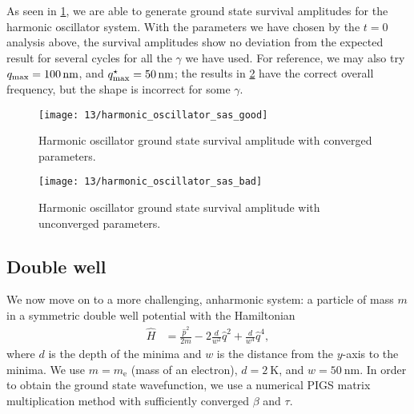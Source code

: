 As seen in \cref{fig:harmonic-oscillator-survival-good}, we are able to generate ground state survival amplitudes for the harmonic oscillator system.
With the parameters we have chosen by the $t = 0$ analysis above, the survival amplitudes show no deviation from the expected result for several cycles for all the $\gamma$ we have used.
For reference, we may also try $q_\mathrm{max} = \SI{100}{\nano\meter}$, and $q_\mathrm{max}^\star = \SI{50}{\nano\meter}$; the results in \cref{fig:harmonic-oscillator-survival-bad} have the correct overall frequency, but the shape is incorrect for some $\gamma$.

\begin{figure}
	\centering
	\texttt{[image: 13/harmonic\_oscillator\_sas\_good]}
	\caption[
		Harmonic oscillator survival amplitude with converged parameters
	]{
		Harmonic oscillator ground state survival amplitude with converged parameters.
		\explainplotsas{}
	}
	\label{fig:harmonic-oscillator-survival-good}
\end{figure}

\begin{figure}
	\centering
	\texttt{[image: 13/harmonic\_oscillator\_sas\_bad]}
	\caption[
		Harmonic oscillator survival amplitude with unconverged parameters
	]{
		Harmonic oscillator ground state survival amplitude with unconverged parameters.
		\explainplotsas{}
	}
	\label{fig:harmonic-oscillator-survival-bad}
\end{figure}


\subsection{Double well}

\label{sec:semiclassical-numerical-dw}

We now move on to a more challenging, anharmonic system: a particle of mass $m$ in a symmetric double well potential with the Hamiltonian
\begin{align}
	\hat{H}
	&= \frac{\hat{p}^2}{2 m} - 2 \frac{d}{w^2} \hat{q}^2 + \frac{d}{w^4} \hat{q}^4,
\end{align}
where $d$ is the depth of the minima and $w$ is the distance from the $y$-axis to the minima.
We use $m = m_\mathrm{e}$ (mass of an electron), $d = \SI{2}{\kelvin}$, and $w = \SI{50}{\nano\meter}$.
In order to obtain the ground state wavefunction, we use a numerical PIGS matrix multiplication method with sufficiently converged $\beta$ and $\tau$.

